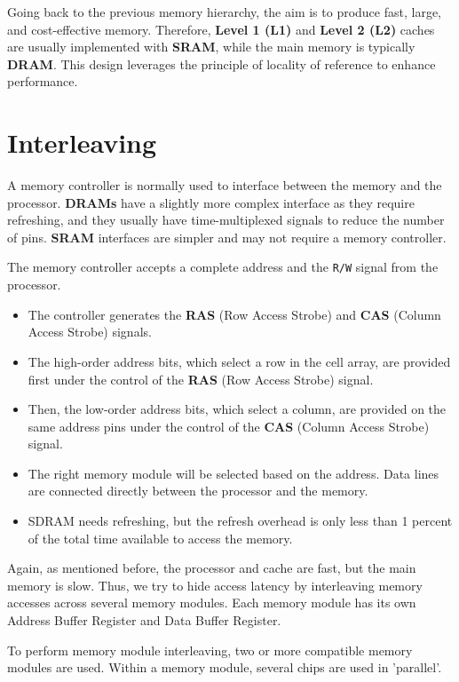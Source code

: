 Going back to the previous memory hierarchy, the aim is to produce fast, large, and cost-effective memory. Therefore, \textbf{Level 1 (L1)} and \textbf{Level 2 (L2)} caches are usually implemented with \textbf{SRAM}, while the main memory is typically \textbf{DRAM}. This design leverages the principle of locality of reference to enhance performance.

\section{Interleaving}
A memory controller is normally used to interface between the memory and the processor. \textbf{DRAMs} have a slightly more complex interface as they require refreshing, and they usually have time-multiplexed signals to reduce the number of pins. \textbf{SRAM} interfaces are simpler and may not require a memory controller.

The memory controller accepts a complete address and the \texttt{R/W} signal from the processor.
\begin{itemize}
    \item The controller generates the \textbf{RAS} (Row Access Strobe) and \textbf{CAS} (Column Access Strobe) signals.
    \item The high-order address bits, which select a row in the cell array, are provided first under the control of the \textbf{RAS} (Row Access Strobe) signal.
    \item Then, the low-order address bits, which select a column, are provided on the same address pins under the control of the \textbf{CAS} (Column Access Strobe) signal.
    \item The right memory module will be selected based on the address. Data lines are connected directly between the processor and the memory.
    \item SDRAM needs refreshing, but the refresh overhead is only less than 1 percent of the total time available to access the memory.
\end{itemize}

Again, as mentioned before, the processor and cache are fast, but the main memory is slow. Thus, we try to hide access latency by interleaving memory accesses across several memory modules. Each memory module has its own Address Buffer Register and Data Buffer Register.

To perform memory module interleaving, two or more compatible memory modules are used. Within a memory module, several chips are used in 'parallel'.

